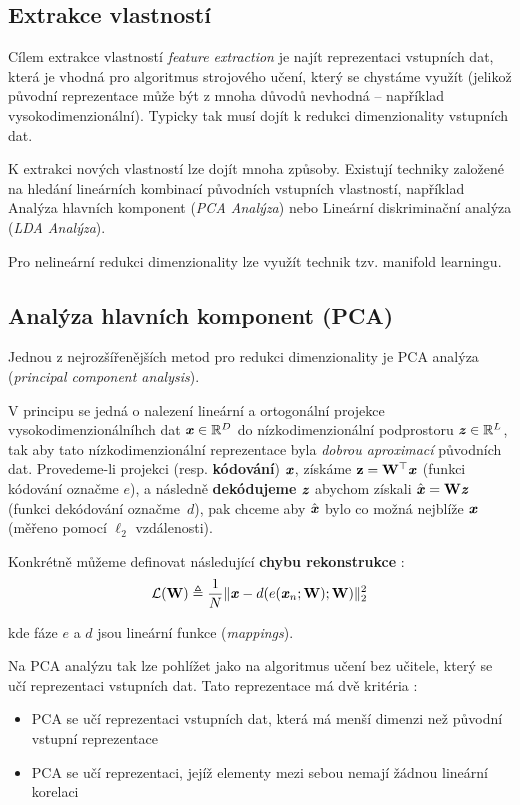 \subsection{Extrakce vlastností}
\label{sec:feature_extraction}
Cílem extrakce vlastností \emph{feature extraction} je najít reprezentaci vstupních dat, která je vhodná pro algoritmus strojového učení, který se chystáme využít (jelikož původní reprezentace může být z mnoha důvodů nevhodná – například vysokodimenzionální).
Typicky tak musí dojít k redukci dimenzionality vstupních dat. \cite{Liu1998}

K extrakci nových vlastností lze dojít mnoha způsoby.
Existují techniky založené na hledání lineárních kombinací původních vstupních vlastností, například Analýza hlavních komponent (\emph{PCA Analýza}) nebo Lineární diskriminační analýza (\emph{LDA Analýza}).

Pro nelineární redukci dimenzionality lze využít technik tzv. manifold learningu.


\subsection{Analýza hlavních komponent (PCA)}
\label{sec:pca}
Jednou z nejrozšířenějších metod pro redukci dimenzionality je PCA analýza (\emph{principal component analysis}).

V principu se jedná o nalezení lineární a ortogonální projekce vysokodimenzionálníhch dat $\textbf{\emph{x}} \in \mathbb{R}^D$ do nízkodimenzionální podprostoru  $\textbf{\emph{z}} \in \mathbb{R}^L$,
tak aby tato nízkodimenzionální reprezentace byla \emph{dobrou aproximací} původních dat.
Provedeme-li projekci (resp. \textbf{kódování}) $\textbf{\emph{x}}$, získáme $\mathbf{z} = \mathbf{W^{\top}} \textbf{\emph{x}}$ (funkci kódování označme $e$),
a následně \textbf{dekódujeme} $\textbf{\emph{z}}$ abychom získali $\hat{\textbf{\emph{x}}} = \mathbf{W}\textbf{\emph{z}}$ (funkci dekódování označme $d$),
pak chceme aby $\hat{\textbf{\emph{x}}}$ bylo co možná nejblíže $\textbf{\emph{x}}$ (měřeno pomocí $\ell_2$ vzdálenosti). \cite{Murphy2022}

Konkrétně můžeme definovat následující \textbf{chybu rekonstrukce} \cite{Murphy2022}:
\begin{equation}
    \mathcal{L}(\mathbf{W}) \triangleq \frac{1}{N} \| \textbf{\emph{x}} - d(e(\textbf{\emph{x}}_n; \mathbf{W}); \mathbf{W})\|^2_2
\end{equation}

kde fáze $e$ a $d$ jsou lineární funkce (\emph{mappings}).

Na PCA analýzu tak lze pohlížet jako na algoritmus učení bez učitele, který se učí reprezentaci vstupních dat. Tato reprezentace má dvě kritéria \cite{Goodfellow2016}:

\begin{itemize}
    \item PCA se učí reprezentaci vstupních dat, která má menší dimenzi než původní vstupní reprezentace
    \item PCA se učí reprezentaci, jejíž elementy mezi sebou nemají žádnou lineární korelaci
\end{itemize}
